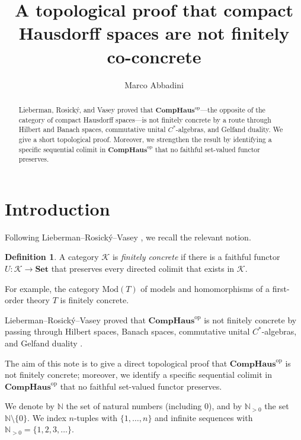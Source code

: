 \documentclass[11pt]{amsart}
\title[Compact Hausdorff spaces are not finitely co-concrete]
  {A topological proof that compact Hausdorff spaces are not finitely co-concrete}
\author{Marco Abbadini}
\newcommand{\CompHaus}{\mathbf{CompHaus}}
\newcommand{\Set}{\mathbf{Set}}
\newcommand{\N}{\mathbb N}
\newcommand{\cK}{\mathcal K}
\newcommand{\op}{\mathrm{op}}
\theoremstyle{definition}
\newtheorem{definition}[theorem]{Definition}
\theoremstyle{remark}
\begin{document}
\begin{abstract}
Lieberman, Rosick\'y, and Vasey proved that
\(\CompHaus^{\op}\)---the opposite of the category of compact Hausdorff spaces---is not finitely concrete by a route through Hilbert and
Banach spaces, commutative unital \(C^*\)-algebras, and Gelfand duality.
We give a short topological proof.
Moreover, we strengthen the result by identifying a specific sequential colimit in \(\CompHaus^{\op}\) that no faithful set-valued functor preserves.
\end{abstract}


\maketitle

\section{Introduction}

Following Lieberman--Rosick\'y--Vasey
\cite[Definition~1]{LiebermanRosickyVasey}, we recall the relevant notion.

\begin{definition}
A category \(\cK\) is \emph{finitely concrete} if there is a faithful
functor \(U\colon\cK\to\Set\) that preserves every directed colimit that
exists in \(\cK\).
\end{definition}

For example, the category \(\mathrm{Mod}(T)\) of models and homomorphisms of a
first-order theory \(T\) is finitely concrete.

Lieberman--Rosick\'y--Vasey proved that \(\CompHaus^{\op}\) is not finitely
concrete by passing through Hilbert spaces, Banach spaces, commutative unital
\(C^*\)-algebras, and Gelfand duality
\cite[Theorem~18, Example~21(2), and the proof of
Theorem~22]{LiebermanRosickyVasey}.

The aim of this note is to give a direct topological proof that $\CompHaus^\op$ is not finitely concrete; moreover, we identify a specific sequential colimit in \(\CompHaus^{\op}\) that no faithful set-valued functor preserves.

We denote by $\N$ the set of natural numbers (including $0$), and by $\N_{>0}$ the set $\N \setminus \{0\}$.
We index $n$-tuples with $\{1, \dots, n\}$ and infinite sequences with $\N_{>0} =\{1, 2, 3, \dots\}$.
\end{document}
